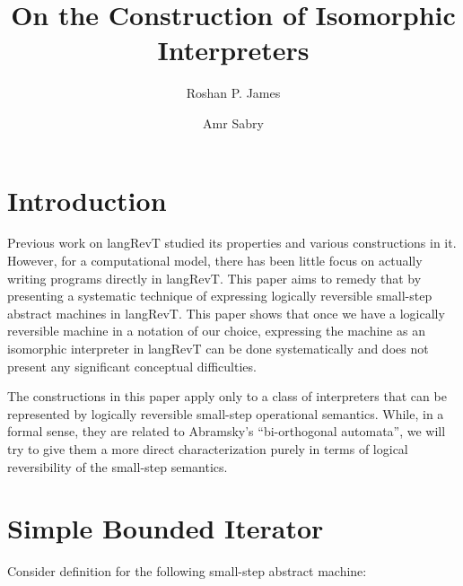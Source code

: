 \documentclass{llncs}
\begin{document}
\title{On the Construction of Isomorphic Interpreters} 
\author{Roshan P. James \and Amr Sabry}
\maketitle

\begin{abstract}
\end{abstract}

\section{Introduction} 


Previous work on {{langRevT}} \cite{rc2011,infeffects} studied its
properties and various constructions in it. However, for a
computational model, there has been little focus on actually writing
programs directly in {{langRevT}}. This paper aims to remedy that by
presenting a systematic technique of expressing logically reversible
small-step abstract machines in {{langRevT}}. This paper shows that
once we have a logically reversible machine in a notation of our
choice, expressing the machine as an isomorphic interpreter in
{{langRevT}} can be done systematically and does not present any
significant conceptual difficulties.

The constructions in this paper apply only to a class of interpreters
that can be represented by logically reversible small-step operational
semantics. While, in a formal sense, they are related to Abramsky's
``bi-orthogonal automata''\cite{abramsky2005structural}, we will try
to give them a more direct characterization purely in terms of logical
reversibility of the small-step semantics.

\section{Simple Bounded Iterator}
Consider definition for the following small-step abstract machine:

%
\end{document}
